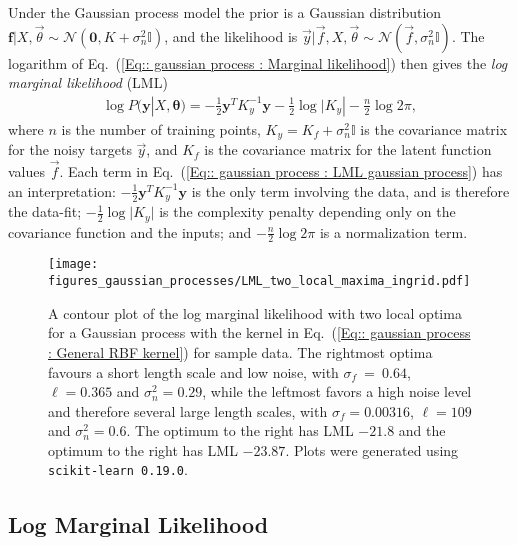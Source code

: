 \documentclass[twoside,english]{uiofysmaster}
\begin{document}
{{Under the Gaussian process model the prior is a Gaussian distribution $\textbf{f}| X, \vec{\theta} \sim \mathcal{N}(\textbf{0}, K + \sigma^2_n \mathbb{I})$, and the likelihood is $\vec{y} | \vec{f}, X, \vec{\theta} \sim \mathcal{N}(\vec{f}, \sigma_n^2 \mathbb{I})$. The logarithm of Eq.~(\ref{Eq:: gaussian process : Marginal likelihood}) then gives the \textit{log marginal likelihood} (LML) \cite{rasmussen2006gaussian} 
\begin{align}\label{Eq:: gaussian process : LML gaussian process}
\log P(\textbf{y}|X, \boldsymbol{\theta}) = - \frac{1}{2} \textbf{y}^T K_y^{-1} \textbf{y} - \frac{1}{2} \log \big|K_y| - \frac{n}{2} \log 2 \pi,
\end{align}
where $n$ is the number of training points, $K_y = K_f + \sigma_n^2 \mathbb{I}$ is the covariance matrix for the noisy targets $\vec{y}$, and $K_f$ is the covariance matrix for the latent function values $\vec{f}$. Each term in Eq.~(\ref{Eq:: gaussian process : LML gaussian process}) has an interpretation: $- \frac{1}{2} \textbf{y}^T K_y^{-1} \textbf{y}$ is the only term involving the data, and is therefore the data-fit; $-\frac{1}{2} \log \big| K_y \big|$ is the complexity penalty depending only on the covariance function and the inputs; and $- \frac{n}{2} \log 2 \pi$ is a normalization term. 



\begin{figure}[H]
\centering
\texttt{[image: figures\_gaussian\_processes/LML\_two\_local\_maxima\_ingrid.pdf]}
\caption[A contour plot of the LML]{A contour plot of the log marginal likelihood with two local optima for a Gaussian process with the kernel in Eq.~(\ref{Eq:: gaussian process : General RBF kernel}) for sample data. The rightmost optima favours a short length scale and low noise, with $\sigma_f~=~0.64$, $\ell = 0.365$ and $\sigma^2_n = 0.29$, while the leftmost favors a high noise level and therefore several large length scales, with $\sigma_f = 0.00316$, $\ell = 109$ and $\sigma^2_n = 0.6$. The optimum to the right has LML $-21.8$ and the optimum to the right has LML $-23.87$. Plots were generated using {\tt scikit-learn 0.19.0}.}
\label{Fig:: gaussian process : LML several local optima}
\end{figure}

\subsection{Log Marginal Likelihood}\label{Sec:: gaussian process : Log Marginal Likelihood}

}}
\end{document}
